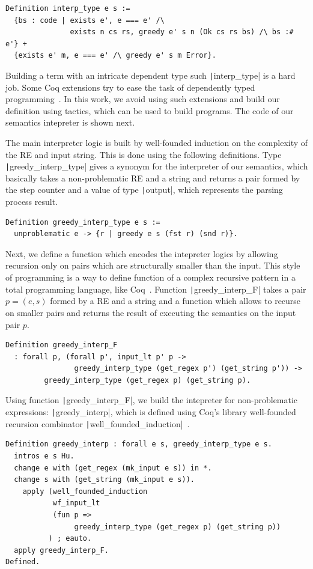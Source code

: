 \documentclass[review]{elsarticle}
\newcommand{\coq}[1]{\texttt|#1|}
\theoremstyle{definition}
\begin{document}
\begin{verbatim}
Definition interp_type e s :=
  {bs : code | exists e', e === e' /\
               exists n cs rs, greedy e' s n (Ok cs rs bs) /\ bs :# e'} +
  {exists e' m, e === e' /\ greedy e' s m Error}.
\end{verbatim}

Building a term with an intricate dependent type such \coq{interp_type} is a
hard job. Some Coq extensions try to ease the task of dependently typed
programming~\cite{Sozeau10}. In this work, we avoid using such extensions and 
build our definition using tactics, which can be used to build programs. The 
code of our semantics intepreter is shown next.

The main interpreter logic is built by well-founded induction on the complexity
of the RE and input string. This is done using the following definitions. Type 
\coq{greedy_interp_type} gives a synonym for the interpreter of our semantics,
which basically takes a non-problematic RE and a string and returns a pair
formed by the step counter and a value of type \coq{output}, which represents
the parsing process result.

\begin{verbatim}
Definition greedy_interp_type e s :=
  unproblematic e -> {r | greedy e s (fst r) (snd r)}.
\end{verbatim}
Next, we define a function which encodes the intepreter logics by allowing 
recursion only on pairs which are structurally smaller than the input. This
style of programming is a way to define function of a complex recursive pattern 
in a total programming language, like Coq~\cite{Chlipala13}. 
Function \coq{greedy_interp_F} takes a pair $p = (e,s)$ formed by a RE and a string and a 
function which allows to recurse on smaller pairs and returns the result of 
executing the semantics on the input pair $p$.
\begin{verbatim}
Definition greedy_interp_F 
  : forall p, (forall p', input_lt p' p ->
                greedy_interp_type (get_regex p') (get_string p')) ->
         greedy_interp_type (get_regex p) (get_string p).
\end{verbatim}
Using function \coq{greedy_interp_F}, we build the intepreter for
non-problematic expressions: \coq{greedy_interp}, which is defined using Coq's 
library well-founded recursion combinator
\coq{well_founded_induction}~\cite{Bertot2010}.
\begin{verbatim}
Definition greedy_interp : forall e s, greedy_interp_type e s.
  intros e s Hu.
  change e with (get_regex (mk_input e s)) in *.
  change s with (get_string (mk_input e s)).
    apply (well_founded_induction
           wf_input_lt
           (fun p => 
                greedy_interp_type (get_regex p) (get_string p))
          ) ; eauto.
  apply greedy_interp_F.  
Defined.
\end{verbatim} 
\end{document}
